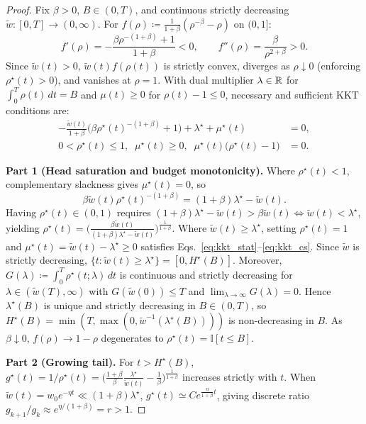 \begin{proof}
Fix $\beta > 0$, $B \in (0, T)$, and continuous strictly decreasing $\tilde{w} : [0, T] \to (0, \infty)$. For $f(\rho) \coloneqq \frac{1}{1+\beta}(\rho^{-\beta} - \rho)$ on $(0, 1]$:
\begin{equation}
f'(\rho) = -\frac{\beta \rho^{-(1+\beta)} + 1}{1 + \beta} < 0, \qquad f''(\rho) = \frac{\beta}{\rho^{2+\beta}} > 0.
\end{equation}
Since $\tilde{w}(t) > 0$, $\tilde{w}(t) f(\rho(t))$ is strictly convex, diverges as $\rho \downarrow 0$ (enforcing $\rho^\star(t) > 0$), and vanishes at $\rho = 1$. With dual multiplier $\lambda \in \mathbb{R}$ for $\int_0^T \rho(t)\,dt = B$ and $\mu(t) \ge 0$ for $\rho(t) - 1 \le 0$, necessary and sufficient KKT conditions are:
\begin{align}
-\frac{\tilde{w}(t)}{1+\beta}\bigl(\beta \rho^\star(t)^{-(1+\beta)} + 1\bigr) + \lambda^\star + \mu^\star(t) &= 0, \label{eq:kkt_stat}\\
0 < \rho^\star(t) \le 1,\;\; \mu^\star(t) \ge 0,\;\; \mu^\star(t)\bigl(\rho^\star(t) - 1\bigr) &= 0. \label{eq:kkt_cs}
\end{align}

\textbf{Part 1 (Head saturation and budget monotonicity).}
Where $\rho^\star(t) < 1$, complementary slackness gives $\mu^\star(t) = 0$, so
\begin{equation}
\beta \tilde{w}(t) \rho^\star(t)^{-(1+\beta)} = (1+\beta)\lambda^\star - \tilde{w}(t).
\end{equation}
Having $\rho^\star(t) \in (0, 1)$ requires $(1+\beta)\lambda^\star - \tilde{w}(t) > \beta\tilde{w}(t) \iff \tilde{w}(t) < \lambda^\star$, yielding $\rho^\star(t) = \bigl(\frac{\beta\tilde{w}(t)}{(1+\beta)\lambda^\star - \tilde{w}(t)}\bigr)^{\frac{1}{1+\beta}}$. Where $\tilde{w}(t) \ge \lambda^\star$, setting $\rho^\star(t) = 1$ and $\mu^\star(t) = \tilde{w}(t) - \lambda^\star \ge 0$ satisfies Eqs.~\eqref{eq:kkt_stat}--\eqref{eq:kkt_cs}. Since $\tilde{w}$ is strictly decreasing, $\{t : \tilde{w}(t) \ge \lambda^\star\} = [0, H^\star(B)]$. Moreover, $G(\lambda) \coloneqq \int_0^T \rho^\star(t; \lambda)\,dt$ is continuous and strictly decreasing for $\lambda \in (\tilde{w}(T), \infty)$ with $G(\tilde{w}(0)) \le T$ and $\lim_{\lambda \to \infty} G(\lambda) = 0$. Hence $\lambda^\star(B)$ is unique and strictly decreasing in $B \in (0, T)$, so $H^\star(B) = \min(T, \max(0, \tilde{w}^{-1}(\lambda^\star(B))))$ is non-decreasing in $B$. As $\beta \downarrow 0$, $f(\rho) \to 1 - \rho$ degenerates to $\rho^\star(t) = \mathbb{I}[t \le B]$.

\textbf{Part 2 (Growing tail).}
For $t > H^\star(B)$, $g^\star(t) = 1/\rho^\star(t) = \bigl(\frac{1+\beta}{\beta}\frac{\lambda^\star}{\tilde{w}(t)} - \frac{1}{\beta}\bigr)^{\frac{1}{1+\beta}}$ increases strictly with $t$. When $\tilde{w}(t) = w_0 e^{-\eta t} \ll (1+\beta)\lambda^\star$, $g^\star(t) \simeq C e^{\frac{\eta}{1+\beta} t}$, giving discrete ratio $g_{k+1}/g_k \approx e^{\eta/(1+\beta)} = r > 1$.
\end{proof}

